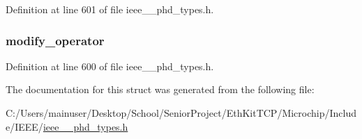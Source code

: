 Definition at line 601 of file ieee\+\_\+\_\+phd\+\_\+types.\+h.

\hypertarget{struct___attribute_mod_entry_a949683c50730e24d4aa0216a294d31e9}{}
\subsubsection[{modify\+\_\+operator}]{ modify\+\_\+operator}\label{struct___attribute_mod_entry_a949683c50730e24d4aa0216a294d31e9}


Definition at line 600 of file ieee\+\_\+\_\+phd\+\_\+types.\+h.



The documentation for this struct was generated from the following file\+:\begin{DoxyCompactItemize}
\item 
C\+:/\+Users/mainuser/\+Desktop/\+School/\+Senior\+Project/\+Eth\+Kit\+T\+C\+P/\+Microchip/\+Include/\+I\+E\+E\+E/\hyperlink{ieee__11073__phd__types_8h}{ieee\+\_\+\_\+phd\+\_\+types.\+h}\end{DoxyCompactItemize}
